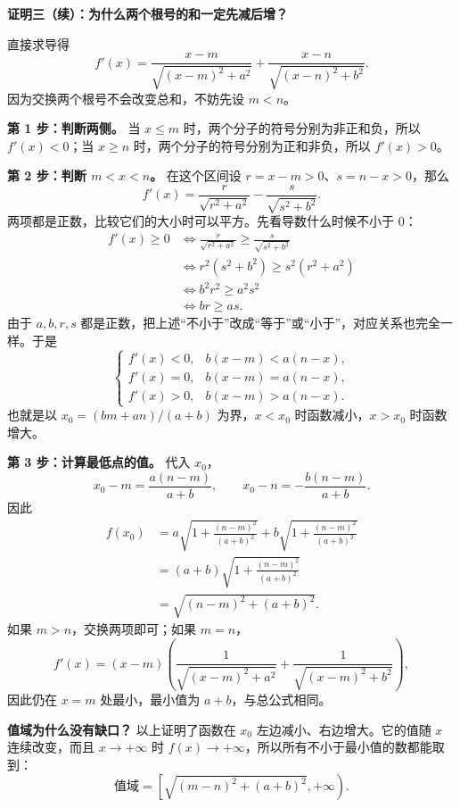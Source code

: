 \begin{proofbox}
\textbf{证明三（续）：为什么两个根号的和一定先减后增？}




直接求导得
\[
 f'(x)=\frac{x-m}{\sqrt{(x-m)^2+a^2}}
        +\frac{x-n}{\sqrt{(x-n)^2+b^2}}.
\]
因为交换两个根号不会改变总和，不妨先设 $m<n$。

\textbf{第 1 步：判断两侧。} 当 $x\leq m$ 时，两个分子的符号分别为非正和负，所以 $f'(x)<0$；当 $x\geq n$ 时，两个分子的符号分别为正和非负，所以 $f'(x)>0$。

\textbf{第 2 步：判断 $m<x<n$。} 在这个区间设 $r=x-m>0$、$s=n-x>0$，那么
\[
 f'(x)=\frac{r}{\sqrt{r^2+a^2}}-\frac{s}{\sqrt{s^2+b^2}}.
\]
两项都是正数，比较它们的大小时可以平方。先看导数什么时候不小于 $0$：
\[
 \begin{aligned}
 f'(x)\geq0
 &\Longleftrightarrow
 \frac{r}{\sqrt{r^2+a^2}}\geq\frac{s}{\sqrt{s^2+b^2}}\\
 &\Longleftrightarrow r^2(s^2+b^2)\geq s^2(r^2+a^2)\\
 &\Longleftrightarrow b^2r^2\geq a^2s^2\\
 &\Longleftrightarrow br\geq as.
 \end{aligned}
\]
由于 $a,b,r,s$ 都是正数，把上述“不小于”改成“等于”或“小于”，对应关系也完全一样。于是
\[
 \begin{cases}
 f'(x)<0,& b(x-m)<a(n-x),\\
 f'(x)=0,& b(x-m)=a(n-x),\\
 f'(x)>0,& b(x-m)>a(n-x).
 \end{cases}
\]
也就是以 $x_0=(bm+an)/(a+b)$ 为界，$x<x_0$ 时函数减小，$x>x_0$ 时函数增大。

\end{proofbox}
\clearpage
\begin{proofbox}
\textbf{第 3 步：计算最低点的值。} 代入 $x_0$，
\[
 x_0-m=\frac{a(n-m)}{a+b},\qquad
 x_0-n=-\frac{b(n-m)}{a+b}.
\]
因此
\[
 \begin{aligned}
 f(x_0)
 &=a\sqrt{1+\frac{(n-m)^2}{(a+b)^2}}
   +b\sqrt{1+\frac{(n-m)^2}{(a+b)^2}}\\
 &=(a+b)\sqrt{1+\frac{(n-m)^2}{(a+b)^2}}\\
 &=\boxed{\sqrt{(n-m)^2+(a+b)^2}}.
 \end{aligned}
\]
如果 $m>n$，交换两项即可；如果 $m=n$，
\[
 f'(x)=(x-m)\left(\frac1{\sqrt{(x-m)^2+a^2}}+\frac1{\sqrt{(x-m)^2+b^2}}\right),
\]
因此仍在 $x=m$ 处最小，最小值为 $a+b$，与总公式相同。

\medskip
\textbf{\textcolor{CProof}{值域为什么没有缺口？}} 以上证明了函数在 $x_0$ 左边减小、右边增大。它的值随 $x$ 连续改变，而且 $x\to+\infty$ 时 $f(x)\to+\infty$，所以所有不小于最小值的数都能取到：
\[
 \boxed{\text{值域}=\left[\sqrt{(m-n)^2+(a+b)^2},+\infty\right)}.
\]
\end{proofbox}
